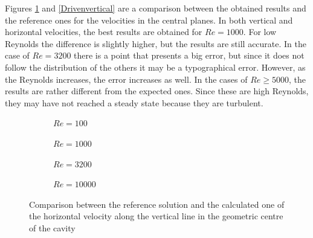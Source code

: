 Figures \ref{Drivenhorizontal} and \ref{Drivenvertical} are a comparison between the obtained results and the reference ones for the velocities in the central planes. In both vertical and horizontal velocities, the best results are obtained for $Re=1000$. For low Reynolds the difference is slightly higher, but the results are still accurate. In the case of $Re=3200$ there is a point that presents a big error, but since it does not follow the distribution of the others it may be a typographical error. However, as the Reynolds increases, the error increases as well. In the cases of $Re\geq5000$, the results are rather different from the expected ones. Since these are high Reynolds, they may have not reached a steady state because they are turbulent.
\begin{figure}[h]
	\centering
	\begin{subfigure}{0.5\textwidth}
		\resizebox{1.4\textwidth}{!}{}
		\caption{$Re=100$}
	\end{subfigure}%
	\begin{subfigure}{0.5\textwidth}
		\resizebox{1.4\textwidth}{!}{}
		\caption{$Re=1000$}
	\end{subfigure}
	\begin{subfigure}{0.5\textwidth}
		\resizebox{1.4\textwidth}{!}{}
		\caption{$Re=3200$}
	\end{subfigure}%
	\begin{subfigure}{0.5\textwidth}
		\resizebox{1.4\textwidth}{!}{}
		\caption{$Re=10000$}
	\end{subfigure}
	\caption[Comparison between the reference solution and the calculated one of the horizontal velocity along the vertical line in the geometric center of the cavity]{Comparison between the reference solution and the calculated one of the horizontal velocity along the vertical line in the geometric centre of the cavity \cite{Ghia1982}}
	\label{Drivenhorizontal}
\end{figure}

